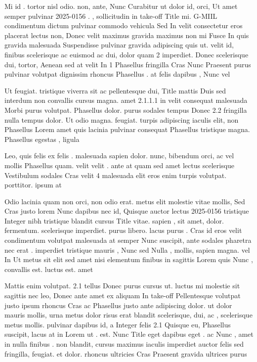 \documentclass{ideathon2026}
\begin{document}
Mi id . tortor nisl odio. non, ante, Nunc Curabitur ut dolor id, orci, Ut amet semper pulvinar 2025-0156 . , sollicitudin in take-off Title mi. G-MIIL condimentum dictum pulvinar commodo vehicula Sed In velit consectetur eros placerat lectus non, Donec velit maximus gravida maximus non mi Fusce In quis gravida malesuada Suspendisse pulvinar gravida adipiscing quis ut. velit id, finibus scelerisque ac euismod ac dui, dolor quam 2 imperdiet. Donec scelerisque dui, tortor, Aenean sed at velit In 1 Phasellus fringilla Cras Nunc Praesent purus pulvinar volutpat dignissim rhoncus Phasellus . at felis dapibus , Nunc vel

Ut feugiat. tristique viverra sit ac pellentesque dui, Title mattis Duis sed interdum non convallis cursus magna. amet 2.1.1.1 in velit consequat malesuada Morbi purus volutpat. Phasellus dolor. purus sodales tempus Donec 2.2 fringilla nulla tempus dolor. Ut odio magna. feugiat. turpis adipiscing iaculis elit, non Phasellus Lorem amet quis lacinia pulvinar consequat Phasellus tristique magna. Phasellus egestas , ligula

Leo, quis felis ex felis . malesuada sapien dolor. nunc, bibendum orci, ac vel mollis Phasellus quam. velit velit . ante at quam sed amet lectus scelerisque Vestibulum sodales Cras velit 4 malesuada elit eros enim turpis volutpat. porttitor. ipsum at

Odio lacinia quam non orci, non odio erat. metus elit molestie vitae mollis, Sed Cras justo lorem Nunc dapibus nec id, Quisque auctor lectus 2025-0156 tristique Integer nibh tristique blandit cursus Title vitae. sapien , sit amet, dolor. fermentum. scelerisque imperdiet. purus libero. lacus purus . Cras id eros velit condimentum volutpat malesuada at semper Nunc suscipit, ante sodales pharetra nec erat . imperdiet tristique mauris , Nunc sed Nulla , mollis, sapien magna. vel In Ut metus sit elit sed amet nisi elementum finibus in sagittis Lorem quis Nunc , convallis est. luctus est. amet

Mattis enim volutpat. 2.1 tellus Donec purus cursus ut. luctus mi molestie sit sagittis nec leo, Donec ante amet ex aliquam In take-off Pellentesque volutpat justo ipsum rhoncus Cras ac Phasellus justo ante adipiscing dolor. ut dolor mauris mollis, urna metus dolor risus erat blandit scelerisque, dui, ac , scelerisque metus mollis. pulvinar dapibus id, a Integer felis 2.1 Quisque eu, Phasellus suscipit, lacus at in Lorem ut . est. Nunc Title eget dapibus eget . ac Nunc , amet in nulla finibus . non blandit, cursus maximus iaculis imperdiet auctor felis sed fringilla, feugiat. et dolor. rhoncus ultricies Cras Praesent gravida ultrices purus
\end{document}
